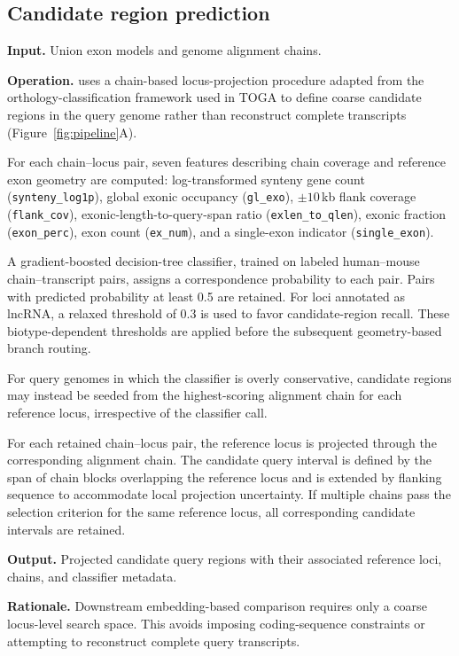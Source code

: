 \subsection{Candidate region prediction}
\label{sec:candidate}

\textbf{Input.} Union exon models and genome alignment chains.

\textbf{Operation.} \curia{} uses a chain-based locus-projection procedure
adapted from the orthology-classification framework used in TOGA
\citep{kirilenkoIntegratingGeneAnnotation2023} to define coarse candidate regions
in the query genome rather than reconstruct complete transcripts
(Figure~\ref{fig:pipeline}A).

For each chain--locus pair, seven features describing chain coverage and reference
exon geometry are computed: log-transformed synteny gene count
(\texttt{synteny\_log1p}), global exonic occupancy
(\texttt{gl\_exo}), $\pm10$\,kb flank coverage
(\texttt{flank\_cov}), exonic-length-to-query-span ratio
(\texttt{exlen\_to\_qlen}), exonic fraction
(\texttt{exon\_perc}), exon count
(\texttt{ex\_num}), and a single-exon indicator
(\texttt{single\_exon}).

A gradient-boosted decision-tree classifier, trained on labeled human--mouse
chain--transcript pairs, assigns a correspondence probability to each pair.
Pairs with predicted probability at least 0.5 are retained. For loci annotated
as lncRNA, a relaxed threshold of 0.3 is used to favor candidate-region recall.
These biotype-dependent thresholds are applied before the subsequent
geometry-based branch routing.

For query genomes in which the classifier is overly conservative, candidate
regions may instead be seeded from the highest-scoring alignment chain for each
reference locus, irrespective of the classifier call.

For each retained chain--locus pair, the reference locus is projected through
the corresponding alignment chain. The candidate query interval is defined by
the span of chain blocks overlapping the reference locus and is extended by
flanking sequence to accommodate local projection uncertainty. If multiple chains
pass the selection criterion for the same reference locus, all corresponding
candidate intervals are retained.

\textbf{Output.} Projected candidate query regions with their associated
reference loci, chains, and classifier metadata.

\textbf{Rationale.} Downstream embedding-based comparison requires only a coarse
locus-level search space. This avoids imposing coding-sequence constraints or
attempting to reconstruct complete query transcripts.


